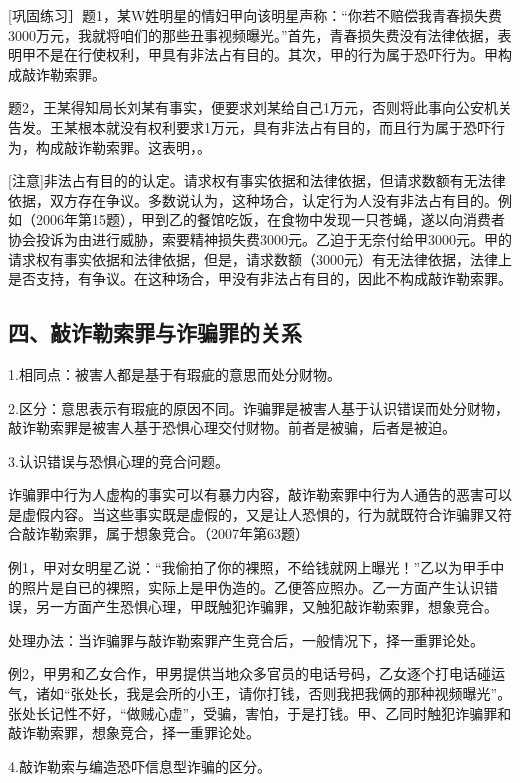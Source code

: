 [巩固练习］题1，某W姓明星的情妇甲向该明星声称：“你若不赔偿我青春损失费3000万元，我就将咱们的那些丑事视频曝光。”首先，青春损失费没有法律依据，表明甲不是在行使权利，甲具有非法占有目的。其次，甲的行为属于恐吓行为。甲构成敲诈勒索罪。

题2，王某得知局长刘某有事实，便要求刘某给自己1万元，否则将此事向公安机关告发。王某根本就没有权利要求1万元，具有非法占有目的，而且行为属于恐吓行为，构成敲诈勒索罪。这表明，。

[注意]非法占有目的的认定。请求权有事实依据和法律依据，但请求数额有无法律依据，双方存在争议。多数说认为，这种场合，认定行为人没有非法占有目的。例如（2006年第15题），甲到乙的餐馆吃饭，在食物中发现一只苍蝇，遂以向消费者协会投诉为由进行威胁，索要精神损失费3000元。乙迫于无奈付给甲3000元。甲的请求权有事实依据和法律依据，但是，请求数额（3000元）有无法律依据，法律上是否支持，有争议。在这种场合，甲没有非法占有目的，因此不构成敲诈勒索罪。

\subsection*{四、敲诈勒索罪与诈骗罪的关系}

1.相同点：被害人都是基于有瑕疵的意思而处分财物。

2.区分：意思表示有瑕疵的原因不同。诈骗罪是被害人基于认识错误而处分财物，敲诈勒索罪是被害人基于恐惧心理交付财物。前者是被骗，后者是被迫。

3.认识错误与恐惧心理的竞合问题。

诈骗罪中行为人虚构的事实可以有暴力内容，敲诈勒索罪中行为人通告的恶害可以是虚假内容。当这些事实既是虚假的，又是让人恐惧的，行为就既符合诈骗罪又符合敲诈勒索罪，属于想象竞合。（2007年第63题）

例1，甲对女明星乙说：“我偷拍了你的裸照，不给钱就网上曝光！”乙以为甲手中的照片是自已的裸照，实际上是甲伪造的。乙便答应照办。乙一方面产生认识错误，另一方面产生恐惧心理，甲既触犯诈骗罪，又触犯敲诈勒索罪，想象竞合。

处理办法：当诈骗罪与敲诈勒索罪产生竞合后，一般情况下，择一重罪论处。

例2，甲男和乙女合作，甲男提供当地众多官员的电话号码，乙女逐个打电话碰运气，诸如“张处长，我是会所的小王，请你打钱，否则我把我俩的那种视频曝光”。张处长记性不好，“做贼心虚”，受骗，害怕，于是打钱。甲、乙同时触犯诈骗罪和敲诈勒索罪，想象竞合，择一重罪论处。

4.敲诈勒索与编造恐吓信息型诈骗的区分。

